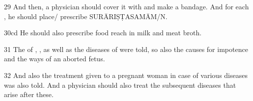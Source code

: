 \begin{translation}
\item [29] 
And then, a physician should cover it with  and make a bandage. 
And for each , he should place/ prescribe 
SURĀRIṢṬASAMĀM/N.

\item [30cd]
He should also prescribe food reach in milk and meat broth.

\item [31]
The  of , , 
 as well as the diseases of  were told, so also the 
causes for impotence and the ways of an aborted fetus. 

\item [32] 
And also the treatment given to a pregnant woman in case of various diseases 
was also told. And a physician should also treat the subsequent diseases that 
arise after these.  

\end{translation}
